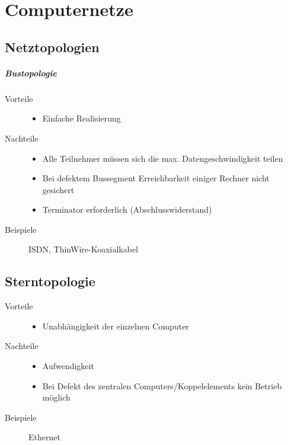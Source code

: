\chapter{Computernetze}

\section{Netztopologien}

\paragraph{Bustopologie}

\begin{description}
\item[Vorteile]
\begin{itemize}
\item Einfache Realisierung
\end{itemize}
\item[Nachteile]
\begin{itemize}
\item Alle Teilnehmer müssen sich die max. Datengeschwindigkeit teilen
\item Bei defektem Bussegment Erreichbarkeit einiger Rechner nicht gesichert
\item Terminator erforderlich (Abschlusswiderstand)
\end{itemize}
\item[Beispiele] ISDN, ThinWire-Koaxialkabel
\end{description}

\section{Sterntopologie}

\begin{description}
\item[Vorteile]
\begin{itemize}
\item Unabhängigkeit der einzelnen Computer
\end{itemize}
\item[Nachteile]
\begin{itemize}
\item Aufwendigkeit
\item Bei Defekt des zentralen Computers/Koppelelements kein Betrieb möglich
\end{itemize}
\item[Beispiele] Ethernet
\end{description}

